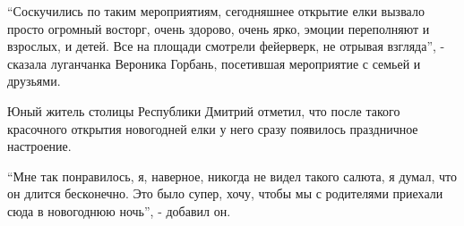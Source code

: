 
\enquote{Соскучились по таким мероприятиям, сегодняшнее открытие елки вызвало просто
огромный восторг, очень здорово, очень ярко, эмоции переполняют и взрослых, и
детей. Все на площади смотрели фейерверк, не отрывая взгляда}, - сказала
луганчанка Вероника Горбань, посетившая мероприятие с семьей и друзьями.


Юный житель столицы Республики Дмитрий отметил, что после такого красочного
открытия новогодней елки у него сразу появилось праздничное настроение.

\enquote{Мне так понравилось, я, наверное, никогда не видел такого салюта, я думал, что
он длится бесконечно. Это было супер, хочу, чтобы мы с родителями приехали сюда
в новогоднюю ночь}, - добавил он.

